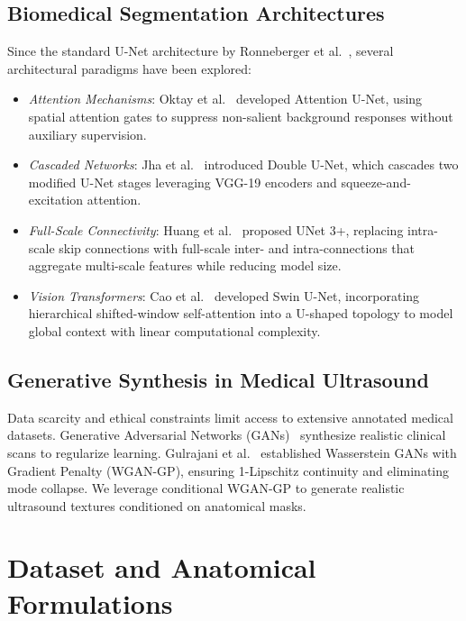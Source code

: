 \documentclass[conference]{IEEEtran}
\begin{document}
\subsection{Biomedical Segmentation Architectures}
Since the standard U-Net architecture by Ronneberger et al.~\cite{ronneberger2015u}, several architectural paradigms have been explored:
\begin{itemize}
    \item \textit{Attention Mechanisms}: Oktay et al.~\cite{oktay2018attention} developed Attention U-Net, using spatial attention gates to suppress non-salient background responses without auxiliary supervision.
    \item \textit{Cascaded Networks}: Jha et al.~\cite{jha2020doubleu} introduced Double U-Net, which cascades two modified U-Net stages leveraging VGG-19 encoders and squeeze-and-excitation attention.
    \item \textit{Full-Scale Connectivity}: Huang et al.~\cite{huang2020unet3plus} proposed UNet 3+, replacing intra-scale skip connections with full-scale inter- and intra-connections that aggregate multi-scale features while reducing model size.
    \item \textit{Vision Transformers}: Cao et al.~\cite{cao2022swin} developed Swin U-Net, incorporating hierarchical shifted-window self-attention into a U-shaped topology to model global context with linear computational complexity.
\end{itemize}

\subsection{Generative Synthesis in Medical Ultrasound}
Data scarcity and ethical constraints limit access to extensive annotated medical datasets. Generative Adversarial Networks (GANs)~\cite{goodfellow2014generative,mirza2014conditional} synthesize realistic clinical scans to regularize learning. Gulrajani et al.~\cite{gulrajani2017improved} established Wasserstein GANs with Gradient Penalty (WGAN-GP), ensuring 1-Lipschitz continuity and eliminating mode collapse. We leverage conditional WGAN-GP to generate realistic ultrasound textures conditioned on anatomical masks.

\section{Dataset and Anatomical Formulations}
\label{sec:dataset}
\end{document}
